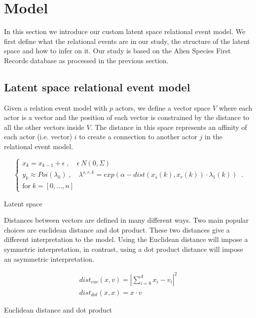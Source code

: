 \documentclass[mscthesis]{usiinfthesis}
\begin{document}
\chapter{Model}

In this section we introduce our custom latent space relational event model. We first define what the relational events are in our study, the structure of the latent space and how to infer on it. Our study is based on the Alien Species First Records database \cite{intro:dataset} as processed in the previous section.

\section{Latent space relational event model}


Given a relation event model with $p$ actors, we define a vector space $V$ where each actor is a vector and the position of each vector is constrained by the distance to all the other vectors inside $V$. The distance in this space represents an affinity of each actor (i.e. vector) $i$ to create a connection to another actor $j$ in the relational event model.


\begin{eqfloat}
\begin{equation}
    \begin{cases}
      x_k = x_{k-1} + \epsilon \; , \quad \epsilon ~ N(0, \Sigma) \\
      y_k \approx Poi(\lambda_k) \; , \quad \lambda^{s, r, k} = exp\left(\alpha-dist(x_s(k), x_r(k)) \cdot \lambda_1(k) \right) \\
      \textrm{for} \; k = [0, ..., n]
    \end{cases}\,.
\label{eq:latentspace}
\end{equation}
\caption{Latent space}
\end{eqfloat}

Distances between vectors are defined in many different ways. Two main popular choices are euclidean distance and dot product. These two distances give a different interpretation to the model. Using the Euclidean distance will impose a symmetric interpretation, in contrast, using a dot product distance will impose an asymmetric interpretation.

\begin{eqfloat}
\begin{equation}
\begin{array}{l}
dist_{euc}(x, v) = |\sum_{i=0}^d x_i - v_i|^2 \\
dist_{dot}(x, x) = x \cdot v
\end{array}
\label{eq:distance_latentspace}
\end{equation}
\caption{Euclidean distance and dot product}
\end{eqfloat}
\end{document}
